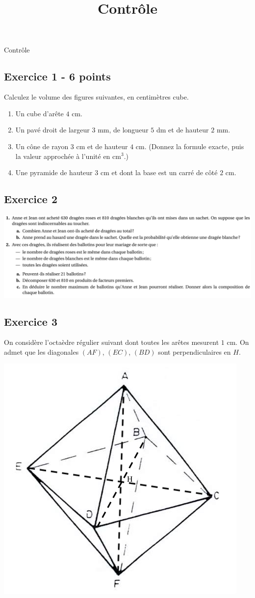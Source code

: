 \documentclass[14 pt]{extarticle}
\title{Contrôle }
\date{}
\theoremstyle{plain}
\begin{document}
	{\begin{center}{\Large{Contrôle}}\end{center}}
\subsection*{Exercice 1 - 6 points}	%
Calculez le volume des figures suivantes, en centimètres cube. \begin{enumerate}
\item Un cube d'arête $4$ cm. 
\item Un pavé droit de largeur $3$ mm, de longueur $5$ dm et de hauteur $2$ mm. 
\item Un cône de rayon $3$ cm et de hauteur $4$ cm. (Donnez la formule exacte, puis la valeur approchée à l'unité en $\mathrm{cm}^3$.)
\item Une pyramide de hauteur $3$ cm et dont la base est un carré de côté $2$ cm. 

\end{enumerate}

\subsection*{Exercice 2}


\includegraphics[scale=.7]{Exo2}



\subsection*{Exercice 3}
On considère l'octaèdre régulier suivant dont toutes les arêtes mesurent $1$ cm. On admet que les diagonales $(AF)$, $(EC)$, $(BD)$ sont perpendiculaires en $H$. 


\includegraphics[scale=.5]{Image.png}





 	
\end{document}

